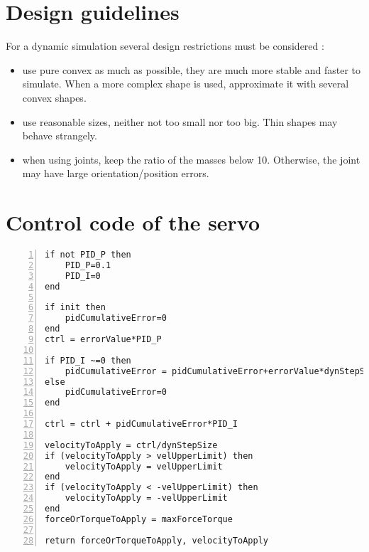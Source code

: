 \chapter{Design guidelines}
For a dynamic simulation several design restrictions must be considered : \begin{itemize}
\item use pure convex as much as possible, they are much more stable and faster to simulate. When a more complex shape is used, approximate it with several convex shapes.

\item use reasonable sizes, neither not too small nor too big. Thin shapes may behave strangely.

\item when using joints, keep the ratio of the masses below 10. Otherwise, the joint may have large orientation/position errors.
\end{itemize}

\chapter{Control code of the servo}
\begin{lstlisting}[language={[5.0]Lua}, numbers = left, tabsize = 4, frame=single,breaklines, keywordstyle=\color{blue}, label={lst:servo}, captionpos = b]
if not PID_P then
    PID_P=0.1
    PID_I=0
end

if init then
    pidCumulativeError=0
end
ctrl = errorValue*PID_P

if PID_I ~=0 then
    pidCumulativeError = pidCumulativeError+errorValue*dynStepSize
else
    pidCumulativeError=0
end

ctrl = ctrl + pidCumulativeError*PID_I

velocityToApply = ctrl/dynStepSize
if (velocityToApply > velUpperLimit) then
    velocityToApply = velUpperLimit
end
if (velocityToApply < -velUpperLimit) then
    velocityToApply = -velUpperLimit
end
forceOrTorqueToApply = maxForceTorque

return forceOrTorqueToApply, velocityToApply
\end{lstlisting}
